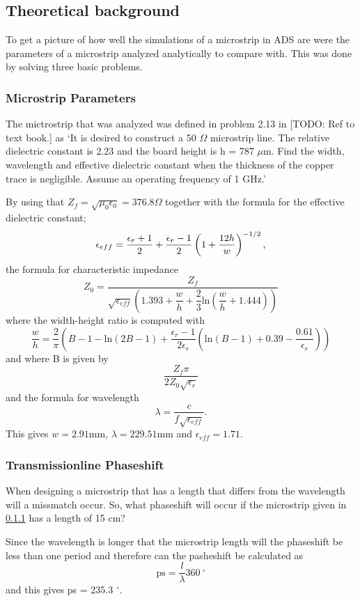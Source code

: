 \documentclass[report.tex]{subfiles}
\begin{document}
\subsection{Theoretical background}
To get a picture of how well the simulations of a microstrip in ADS are were the parameters of a microstrip analyzed analytically to compare with. This was done by solving three basic problems.

\subsubsection{Microstrip Parameters}\label{subsubsec: Microstrip_Parameters}
The mictrostrip that was analyzed was defined in problem 2.13 in [TODO: Ref to text book.] as
`It is desired to construct a 50 $\Omega$ microstrip line. The relative dielectric constant is 2.23 and the board height is h = 787 $\mu \text{m.}$ Find the width, wavelength and effective dielectric constant when the thickness of the copper trace is negligible. Assume an operating frequency of 1 GHz.'

By using that $Z_{f} = \sqrt{\mu_{0} \epsilon_{0}} = 376.8 \Omega$ together with the formula for the effective dielectric constant;
\begin{equation}
	\epsilon_{eff} = \dfrac{\epsilon_{r} + 1}{2} + \dfrac{\epsilon_{r} - 1}{2} \left(1 + {\dfrac{12 h}{w}} \right)^{-1/2} \text ,
\end{equation}
the formula for characteristic impedance
\begin{equation}
	Z_0 = \dfrac{Z_f}{\sqrt{\epsilon_{eff}}\left(1.393 + \dfrac{w}{h} + \dfrac{2}{3} \text{ln}\left(\dfrac{w}{h} + 1.444 \right)\right)}
\end{equation}
where the width-height ratio is computed with
\begin{equation}
	\dfrac{w}{h} = \dfrac{2}{\pi}\left(B - 1 - \text{ln}\left(2B - 1 \right) + \dfrac{\epsilon_r - 1}{2 \epsilon_r}\left(\text{ln}\left(B -1\right) + 0.39 - \dfrac{0.61}{\epsilon_r}\right)\right)
\end{equation}
and where B is given by
\begin{equation}
\dfrac{Z_f \pi}{2Z_0\sqrt{\epsilon_r}}
\end{equation}
and the formula for wavelength
\begin{equation}
	\lambda = \dfrac{c}{f\sqrt{\epsilon_{eff}}}.
\end{equation}
This gives $w = 2.91 \text{mm}$, $\lambda = 229.51 \text{mm}$ and $\epsilon_{eff} = 1.71 \text{.}$
\subsubsection{Transmissionline Phaseshift}
When designing a microstrip that has a length that differs from the wavelength will a missmatch occur. So, what phaseshift will occur if the microstrip given in \ref{subsubsec: Microstrip_Parameters} has a length of 15 cm?

Since the wavelength is longer that the microstrip length will the phaseshift be less than one period and therefore can the pasheshift be calculated as
\begin{equation}
	\text{ps} = \dfrac{l}{\lambda} 360 \:^\circ
\end{equation}
and this gives ps = 235.3 $^\circ$.
\end{document}
